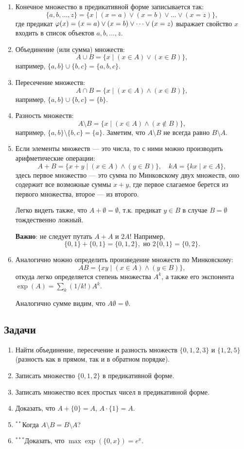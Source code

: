 \begin{enumerate}
\item Конечное множество в предикативной форме записывается так:
$$
\{a,b,\dots,z\} = \{x\mid (x=a)\lor(x=b)\lor\dots\lor(x=z)\},
$$
где предикат $\varphi(x)=(x=a)\lor(x=b)\lor\dots\lor(x=z)$ выражает свойство $x$ входить в список объектов $a,b,\dots,z$.
\item Объединение (или сумма) множеств:
$$
A\cup B = \{x\mid (x\in A)\lor(x\in B)\},
$$
например, $\{a,b\}\cup\{b,c\}=\{a,b,c\}$.
\item Пересечение множеств:
$$
A\cap B = \{x\mid (x\in A)\land(x\in B)\},
$$
например, $\{a,b\}\cup\{b,c\}=\{b\}$.
\item Разность множеств:
$$
A\setminus B = \{x\mid (x\in A)\land(x\notin B)\},
$$
например, $\{a,b\}\setminus\{b,c\}=\{a\}$. Заметим, что $A\setminus B$ не всегда равно $B\setminus A$.
\item Если элементы множеств --- это числа, то с ними можно производить арифметические операции:
$$
A+B = \{x+y\mid (x\in A)\land(y\in B)\}, \quad kA = \{kx\mid x\in A\},
$$
здесь первое множество --- это сумма по Минковскому двух множеств, оно содержит все возможные суммы $x+y$, где первое слагаемое берется из первого множества, второе --- из второго.

Легко видеть также, что $A+\emptyset=\emptyset$, т.к. предикат $y\in B$ в случае $B=\emptyset$ тождественно ложный.

\textbf{Важно}: не следует путать $A+A$ и $2A$! Например,
$$
\{0,1\}+\{0,1\}=\{0,1,2\},\mbox{ но }2\{0,1\}=\{0,2\}.
$$

\item Аналогично можно определить произведение множеств по Минковскому:
$$
AB = \{xy\mid (x\in A)\land(y\in B)\},
$$
откуда легко определяется степень множества $A^k$, а также его экспонента $\exp(A)=\sum_k(1/k!)A^k$.

Аналогично сумме видим, что $A\emptyset=\emptyset$.
\end{enumerate}

\subsection*{Задачи}
\begin{enumerate}
\item Найти объединение, пересечение и разность множеств $\{0,1,2,3\}$ и $\{1,2,5\}$ (разность как в прямом, так и в обратном порядке).
\item Записать множество $\{0,1,2\}$ в предикативной форме.
\item Записать множество всех простых чисел в предикативной форме.
\item Доказать, что $A+\{0\}=A$, $A\cdot\{1\}=A$.
\item ${}^{**}$Когда $A\setminus B=B\setminus A$?
\item ${}^{***}$Доказать, что $\max\exp(\{0,x\}) = e^x$.
\end{enumerate}


